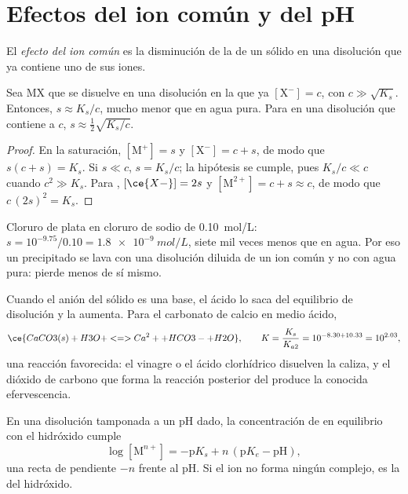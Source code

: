 \section{Efectos del ion común y del pH}

\begin{definition}\label{def:b1:precipitation:common-ion}
El \emph{efecto del ion común} es la disminución de
la  de un sólido en una disolución que ya contiene uno de sus
iones.
\end{definition}

\begin{proposition}\label{prop:b1:precipitation:common-ion}
Sea MX que se disuelve en una disolución en la que ya $[\mathrm{X}^-] = c$,
con $c \gg \sqrt{K_s}$. Entonces, $s \approx K_s/c$, mucho menor que en
agua pura. Para  en una disolución que contiene  a $c$,
$s \approx \frac12\sqrt{K_s/c}$.
\end{proposition}

\begin{proof}
En la saturación, $[\mathrm{M}^+] = s$ y $[\mathrm{X}^-] = c + s$, de modo
que $s(c + s) = K_s$. Si $s \ll c$, $s = K_s/c$; la hipótesis se cumple,
pues $K_s/c \ll c$ cuando $c^2 \gg K_s$. Para , $[\ce{X-}] = 2s$ y
$[\mathrm{M}^{2+}] = c + s \approx c$, de modo que $c\,(2s)^2 = K_s$.
\end{proof}

Cloruro de plata en cloruro de sodio de \qty{0.10}{mol/L}:
$s = 10^{-9.75}/0.10
= \qty{1.8e-9}{mol/L}$, siete mil veces menos que en agua. Por eso un
precipitado se lava con una disolución diluida de un ion común y no con
agua pura: pierde menos de sí mismo.

Cuando el anión del sólido es una base, el ácido lo saca del equilibrio de
disolución y la  aumenta. Para el carbonato de calcio en
medio ácido,
\[
  \ce{CaCO3(s) + H3O+ <=> Ca^2+ + HCO3- + H2O}, \qquad
  K = \frac{K_s}{K_{a2}} = 10^{-8.30 + 10.33} = 10^{2.03} ,
\]
una reacción favorecida: el vinagre o el ácido clorhídrico disuelven la
caliza, y el dióxido de carbono que forma la reacción posterior del
 produce la conocida efervescencia.

\begin{proposition}\label{prop:b1:precipitation:hydroxide-ph}
En una disolución tamponada a un pH dado, la concentración de 
en equilibrio con el hidróxido  cumple
\[
  \log[\mathrm{M}^{n+}] = -\mathrm{p}K_s + n\,(\mathrm{p}K_e - \mathrm{pH}) ,
\]
una recta de pendiente $-n$ frente al pH. Si el ion no forma ningún
complejo, es la  del hidróxido.
\end{proposition}

